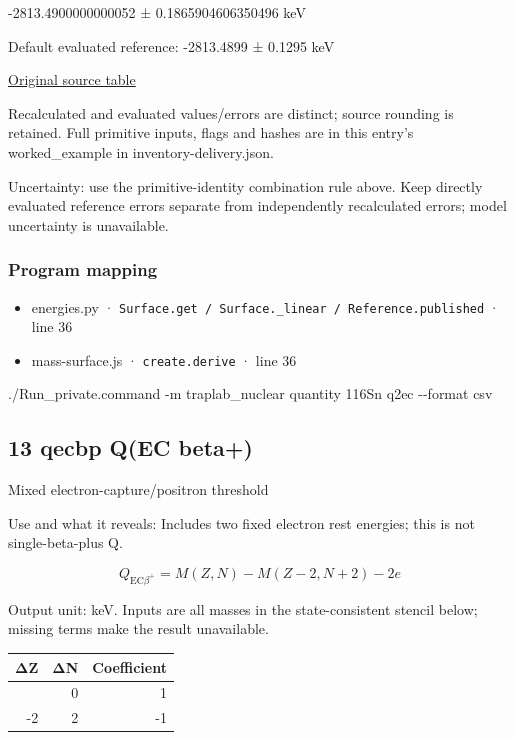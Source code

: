 \documentclass[
  11pt,
  letterpaper,
]{article}
\newenvironment{Shaded}{}{}
\newcommand{\AttributeTok}[1]{\textcolor[rgb]{0.49,0.56,0.16}{#1}}
\newcommand{\ExtensionTok}[1]{#1}
\newcommand{\NormalTok}[1]{#1}
\providecommand{\tightlist}{%
  \setlength{\itemsep}{0pt}\setlength{\parskip}{0pt}}
\begin{document}
-2813.4900000000052 ± 0.1865904606350496 keV

Default evaluated reference: -2813.4899 ± 0.1295 keV

\href{https://www-nds.iaea.org/amdc/ame2020/rct1.mas20.txt}{Original
source table}

Recalculated and evaluated values/errors are distinct; source rounding
is retained. Full primitive inputs, flags and hashes are in this entry's
worked\_example in inventory-delivery.json.

Uncertainty: use the primitive-identity combination rule above. Keep
directly evaluated reference errors separate from independently
recalculated errors; model uncertainty is unavailable.

\subsubsection{Program mapping}\label{program-mapping-11}

\begin{itemize}
\tightlist
\item
  energies.py ·
  \texttt{Surface.get\ /\ Surface.\_linear\ /\ Reference.published} ·
  line 36
\item
  mass-surface.js · \texttt{create.derive} · line 36
\end{itemize}

\begin{Shaded}
\begin{Highlighting}[]
\ExtensionTok{./Run\_private.command} \AttributeTok{{-}m}\NormalTok{ traplab\_nuclear quantity 116Sn q2ec }\AttributeTok{{-}{-}format}\NormalTok{ csv}
\end{Highlighting}
\end{Shaded}

\subsection{13 qecbp Q(EC beta+)}\label{qecbp-qec-beta}

Mixed electron-capture/positron threshold

Use and what it reveals: Includes two fixed electron rest energies; this
is not single-beta-plus Q.

\[
Q_{{\mathrm{EC}}\beta^+}=M(Z,N)-M(Z-2,N+2)-2e
\]

Output unit: keV. Inputs are all masses in the state-consistent stencil
below; missing terms make the result unavailable.

\begin{longtable}[]{@{}rrr@{}}
\toprule\noalign{}
ΔZ & ΔN & Coefficient \\
\midrule\noalign{}
\endhead
\bottomrule\noalign{}
\endlastfoot
0 & 0 & 1 \\
-2 & 2 & -1 \\
\end{longtable}
\end{document}
